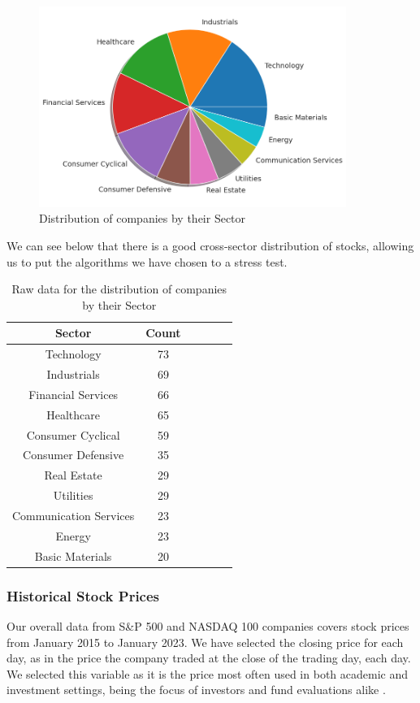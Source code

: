 \documentclass[11pt]{article}
\begin{document}
\begin{figure}[H]
\centering
\includegraphics[width=10cm]{img/industries.png} 
\caption{Distribution of companies by their Sector}

\end{figure}

We can see below that there is a good cross-sector distribution of stocks, allowing us to put the algorithms we have chosen to a stress test. 

\begin{table}[H]
\centering
\fontsize{7}{7}\selectfont
\begin{tabular}{|c|c|c|c|c|c|}
\hline
\textbf{Sector} & \textbf{Count}  \\
\hline
Technology & 73 \\
Industrials & 69 \\
Financial Services & 66 \\
Healthcare & 65 \\
Consumer Cyclical & 59 \\
Consumer Defensive & 35 \\
Real Estate & 29 \\
Utilities & 29 \\
Communication Services & 23 \\
Energy & 23 \\
Basic Materials & 20 \\
\hline
\end{tabular}
\caption{Raw data for the distribution of companies by their Sector}
\label{tab:rawsector}
\end{table}



\subsubsection{Historical Stock Prices}

Our overall data from S\&P 500 and NASDAQ 100 companies covers stock prices from January 2015 to January 2023. We have selected the closing price for each day, as in the price the company traded at the close of the trading day, each day. We selected this variable as it is the price most often used in both academic and investment settings, being the focus of investors and fund evaluations alike \cite{closePrice}. 
\end{document}
